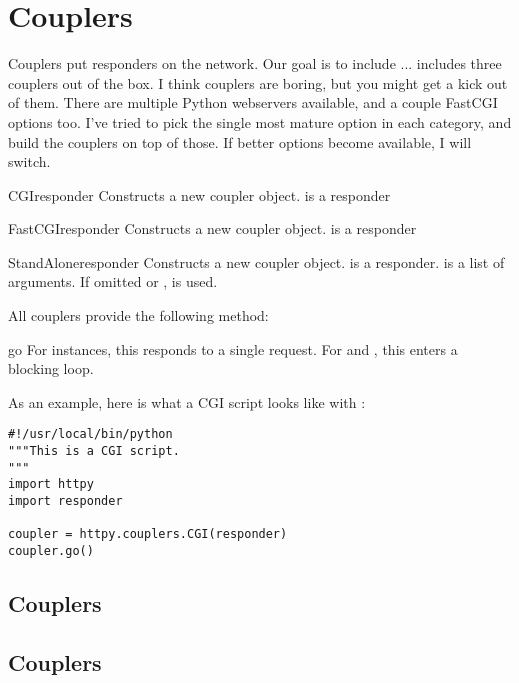 \section{Couplers \label{couplers}}

Couplers put responders on the network. Our goal is to include ...
 includes three couplers out of the box. I think couplers are
boring, but you might get a kick out of them. There are multiple Python
webservers available, and a couple FastCGI options too. I've tried to pick the
single most mature option in each category, and build the couplers on top of
those. If better options become available, I will switch.


\begin{classdesc}{CGI}{responder} Constructs a new  coupler object.
 is a responder \end{classdesc}

\begin{classdesc}{FastCGI}{responder} Constructs a new  coupler
object.  is a responder \end{classdesc}

\begin{classdesc}{StandAlone}{responder} Constructs a new
 coupler object.  is a responder.  is
a list of arguments. If omitted or ,  is used.
\end{classdesc}

All couplers provide the following method:

\begin{methoddesc}{go}{} For  instances, this responds to a single
request. For  and , this enters a blocking
loop.\end{methoddesc}

As an example, here is what a CGI script looks like with :

\begin{verbatim}
#!/usr/local/bin/python
"""This is a CGI script.
"""
import httpy
import responder

coupler = httpy.couplers.CGI(responder)
coupler.go()
\end{verbatim}



\subsection{ Couplers \label{cgi}}
\subsection{ Couplers \label{standalone}}
